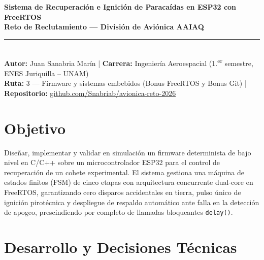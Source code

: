 \documentclass[10pt, letterpaper]{article}
\begin{document}
\begin{center}
    {\Large \textbf{Sistema de Recuperación e Ignición de Paracaídas en ESP32 con FreeRTOS}} \\[3pt]
    {\small \textbf{Reto de Reclutamiento — División de Aviónica AAIAQ}} \\[2pt]
    \rule{\textwidth}{0.8pt} \\[2pt]
    \textbf{Autor:} Juan Sanabria Marín \quad|\quad
    \textbf{Carrera:} Ingeniería Aeroespacial (1.\textsuperscript{er} semestre, ENES Juriquilla -- UNAM) \\
    \textbf{Ruta:} 3 — Firmware y sistemas embebidos (Bonus FreeRTOS y Bonus Git) \quad|\quad
    \textbf{Repositorio:} \href{https://github.com/Snabriab/avionica-reto-2026}{github.com/Snabriab/avionica-reto-2026}
\end{center}
\vspace{-4pt}

\section{Objetivo}
Diseñar, implementar y validar en simulación un firmware determinista de bajo nivel en C/C++ sobre un microcontrolador ESP32 para el control de recuperación de un cohete experimental. El sistema gestiona una máquina de estados finitos (FSM) de cinco etapas con arquitectura concurrente dual-core en FreeRTOS, garantizando cero disparos accidentales en tierra, pulso único de ignición pirotécnica y despliegue de respaldo automático ante falla en la detección de apogeo, prescindiendo por completo de llamadas bloqueantes \texttt{delay()}.

\section{Desarrollo y Decisiones Técnicas}
\end{document}
